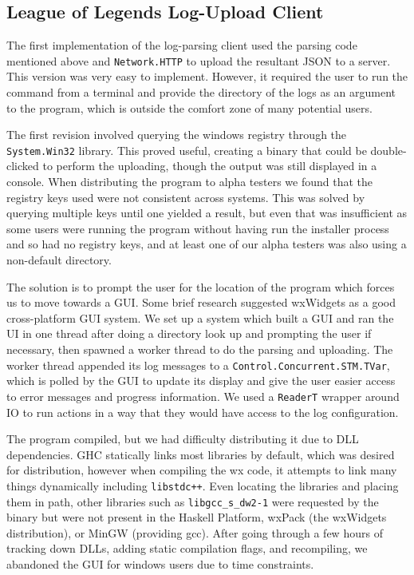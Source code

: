 \documentclass[letterpaper,twocolumn,9pt]{article}
\newcommand{\code}[1]{\texttt{#1}}
\begin{document}
\subsection{League of Legends Log-Upload Client}

The first implementation of the log-parsing client used the parsing code mentioned above and \code{Network.HTTP} to upload the resultant JSON to a server.  This version was very easy to implement.  However, it required the user to run the command from a terminal and provide the directory of the logs as an argument to the program, which is outside the comfort zone of many potential users.

The first revision involved querying the windows registry through the \code{System.Win32} library.  This proved useful, creating a binary that could be double-clicked to perform the uploading, though the output was still displayed in a console.  When distributing the program to alpha testers we found that the registry keys used were not consistent across systems.  This was solved by querying multiple keys until one yielded a result, but even that was insufficient as some users were running the program without having run the installer process and so had no registry keys, and at least one of our alpha testers was also using a non-default directory.

The solution is to prompt the user for the location of the program which forces us to move towards a GUI.  Some brief research suggested wxWidgets as a good cross-platform GUI system.  We set up a system which built a GUI and ran the UI in one thread after doing a directory look up and prompting the user if necessary, then spawned a worker thread to do the parsing and uploading.  The worker thread appended its log messages to a \code{Control.Concurrent.STM.TVar}, which is polled by the GUI to update its display and give the user easier access to error messages and progress information.  We used a \code{ReaderT} wrapper around IO to run actions in a way that they would have access to the log configuration.

The program compiled, but we had difficulty distributing it due to DLL dependencies.  GHC statically links most libraries by default, which was desired for distribution, however when compiling the wx code, it attempts to link many things dynamically including \code{libstdc++}.  Even locating the libraries and placing them in path, other libraries such as \code{libgcc\_s\_dw2-1} were requested by the binary but were not present in the Haskell Platform, wxPack (the wxWidgets distribution), or MinGW (providing gcc).  After going through a few hours of tracking down DLLs, adding static compilation flags, and recompiling, we abandoned the GUI for windows users due to time constraints.
\end{document}
